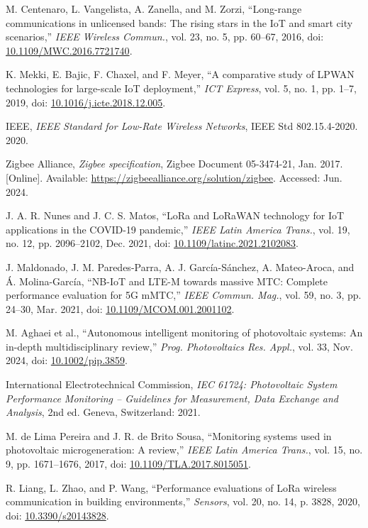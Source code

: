 \documentclass{ieeeaccess}
\begin{document}
\begin{thebibliography}{00}
M. Centenaro, L. Vangelista, A. Zanella, and M. Zorzi, “Long-range communications in unlicensed bands: The rising stars in the IoT and smart city scenarios,” \emph{IEEE Wireless Commun.}, vol. 23, no. 5, pp. 60–67, 2016, doi: \url{10.1109/MWC.2016.7721740}.

K. Mekki, E. Bajic, F. Chaxel, and F. Meyer, “A comparative study of LPWAN technologies for large-scale IoT deployment,” \emph{ICT Express}, vol. 5, no. 1, pp. 1–7, 2019, doi: \url{10.1016/j.icte.2018.12.005}.

IEEE, \emph{IEEE Standard for Low-Rate Wireless Networks}, IEEE Std 802.15.4-2020. 2020.

Zigbee Alliance, \emph{Zigbee specification}, Zigbee Document 05-3474-21, Jan. 2017. [Online]. Available: \url{https://zigbeealliance.org/solution/zigbee}. Accessed: Jun. 2024.

J. A. R. Nunes and J. C. S. Matos, “LoRa and LoRaWAN technology for IoT applications in the COVID-19 pandemic,” \emph{IEEE Latin America Trans.}, vol. 19, no. 12, pp. 2096–2102, Dec. 2021, doi: \url{10.1109/latinc.2021.2102083}.

J. Maldonado, J. M. Paredes-Parra, A. J. García-Sánchez, A. Mateo-Aroca, and Á. Molina-García, “NB-IoT and LTE-M towards massive MTC: Complete performance evaluation for 5G mMTC,” \emph{IEEE Commun. Mag.}, vol. 59, no. 3, pp. 24–30, Mar. 2021, doi: \url{10.1109/MCOM.001.2001102}.

M. Aghaei et al., “Autonomous intelligent monitoring of photovoltaic systems: An in-depth multidisciplinary review,” \emph{Prog. Photovoltaics Res. Appl.}, vol. 33, Nov. 2024, doi: \url{10.1002/pip.3859}.

International Electrotechnical Commission, \emph{IEC 61724: Photovoltaic System Performance Monitoring – Guidelines for Measurement, Data Exchange and Analysis}, 2nd ed. Geneva, Switzerland: 2021.

M. de Lima Pereira and J. R. de Brito Sousa, “Monitoring systems used in photovoltaic microgeneration: A review,” \emph{IEEE Latin America Trans.}, vol. 15, no. 9, pp. 1671–1676, 2017, doi: \url{10.1109/TLA.2017.8015051}.

R. Liang, L. Zhao, and P. Wang, “Performance evaluations of LoRa wireless communication in building environments,” \emph{Sensors}, vol. 20, no. 14, p. 3828, 2020, doi: \url{10.3390/s20143828}.


\end{thebibliography}
\end{document}
